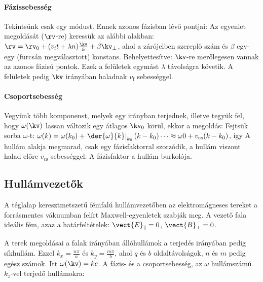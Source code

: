    \paragraph{Fázissebesség} Tekintsünk csak egy módust.
   Ennek azonos fázisban lévő pontjai:
   Az egyenlet megoldását ($\rv$-re) keressük az alábbi alakban: $\rv=\rv_0+(v_\text{f} t + \lambda n)\frac{\kv}{k}+\beta\kv_{\perp}$, ahol a zárójelben szereplő szám  és $\beta$ egy-egy (furcsán megválasztott) konstans.
   Behelyettesítve:
   $\kv$-re merőlegesen vannak az azonos fázisú pontok.
   Ezek a felületek egymást $\lambda$ távolságra követik.
   A felületek pedig $\kv$ irányában haladnak $v_\text{f}$ sebességgel. 
   
   \paragraph{Csoportsebesség} Vegyünk több komponenst, melyek egy irányban terjednek, illetve tegyük fel, hogy $\omega(\kv)$ lassan változik egy átlagos $\kv_0$ körül, ekkor a megoldás:
   Fejtsük sorba $\omega$-t: $\omega(k)=\omega(k_0)+\left.\der{\omega}{k}\right|_{k_0}(k-k_0)\dots\approx\omega0+v_\text{cs}(k-k_0)$, így
   A hullám alakja megmarad, csak egy fázisfaktorral szorzódik, a hullám viszont halad előre $v_\text{cs}$ sebességgel.
   A fázisfaktor a hullám burkolója.
   
  \subsection{Hullámvezetők}
   
   A téglalap keresztmetszetű fémfalú hullámvezetőben az elektromágneses tereket a forrásmentes vákuumban felírt Maxwell-egyenletek szabják meg.
   A vezető fala ideális fém, azaz a határfeltételek: $\vect{E}_\parallel=0$, $\vect{B}_\perp=0$.
   
   A terek megoldásai a falak irányában állóhullámok a terjedés irányában pedig síkhullám.
   Ezzel $k_x=\frac{n\pi}{a}$ és  $k_y=\frac{m\pi}{b}$, ahol $q$ és $b$ oldaltávolságok, $n$ és $m$ pedig egész számok.
   Itt $\omega(\kv)=kc$.
   A fázis- és a csoportsebesség, az $\omega$ hullámszámú $k_z$-vel terjedő hullámokra:
   
